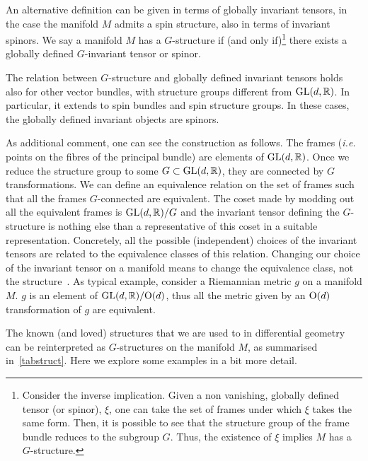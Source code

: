 \documentclass[debug]{phd}
\begin{document}
					An alternative definition can be given in terms of globally invariant tensors, in the case the manifold $M$ admits a spin structure, also in terms of invariant spinors.
					We say a manifold $M$ has a $G$-structure if (and only if)\footnote{%
						Consider the inverse implication. 
						Given a non vanishing, globally defined tensor (or spinor), $\xi$, one can take the set of frames under which $\xi$ takes the same form.
						Then, it is possible to see that the structure group of the frame bundle reduces to the subgroup $G$.
						Thus, the existence of $\xi$ implies $M$ has a $G$-structure.%
						}
					there exists a globally defined $G$-invariant tensor or spinor.
					
					The relation between $G$-structure and globally defined invariant tensors holds also for other vector bundles, with structure groups different from $\mathrm{GL}(d,\mathbb{R})$. 
					In particular, it extends to spin bundles and spin structure groups.
					In these cases, the globally defined invariant objects are spinors.
					
					As additional comment, one can see the construction as follows. 
					The frames (\emph{i.e.} points on the fibres of the principal bundle) are elements of $\mathrm{GL}(d,\mathbb{R})$. 
					Once we reduce the structure group to some $G \subset \mathrm{GL}(d,\mathbb{R})$, they are connected by $G$ transformations.
					We can define an equivalence relation on the set of frames such that all the frames $G$-connected are equivalent.
					The coset made by modding out all the equivalent frames is $\mathrm{GL}(d,\mathbb{R})/G$ and the invariant tensor defining the $G$-structure is nothing else than a representative of this coset in a suitable representation.
					Concretely, all the possible (independent) choices of the invariant tensors are related to the equivalence classes of this relation. 
					Changing our choice of the invariant tensor on a manifold means to change the equivalence class, not the structure~\cite{liegroupstruc}.
					As typical example, consider a Riemannian metric $g$ on a manifold $M$.
					$g$ is an element of $\mathrm{GL}(d,\mathbb{R})/\mathrm{O}(d)$, thus all the metric given by an $\mathrm{O}(d)$ transformation of $g$ are equivalent.
					
					The known (and loved) structures that we are used to in differential geometry can be reinterpreted as $G$-structures on the manifold $M$, as summarised in~\cref{tabstruct}.
					Here we explore some examples in a bit more detail.
					
\end{document}
